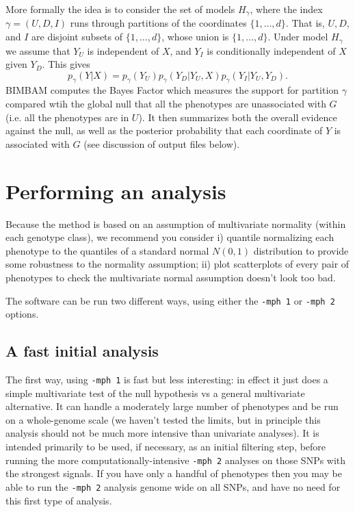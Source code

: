 \documentclass[11pt]{article}
\def\I{I}
\def\U{U}
\def\D{D}
\def\p{p}
\begin{document}
More formally the idea is to consider the set of models $H_\gamma$, where the index $\gamma=(\U,\D,\I)$ runs through 
partitions of the coordinates $\{1,\dots,d\}$.
That is, $\U, \D$, and $\I$ are disjoint subsets of $\{1,\dots,d\}$, whose union is $\{1,\dots,d\}$. 
Under model $H_\gamma$ we assume that $Y_\U$ is independent of $X$, and $Y_\I$ is conditionally independent of $X$ given $Y_\D$. This gives
\begin{equation}
{\p}_\gamma(Y | X) = {\p}_\gamma(Y_{\U}) {\p}_{\gamma}(Y_{\D} | Y_{\U}, X) {\p}_\gamma(Y_{\I} | Y_{\U},Y_{\D}).
\end{equation}
BIMBAM computes the Bayes Factor which measures the support for partition $\gamma$ compared wtih the global null that all the phenotypes are unassociated with $G$ (i.e. all the phenotypes are in $U$). It then summarizes both the overall evidence against the null, as well as the posterior probability that each coordinate of $Y$ is associated with $G$ (see discussion of output files below).

\section{Performing an analysis}

Because the method is based on an assumption of multivariate normality (within each genotype class),
we recommend you consider  i) quantile normalizing each phenotype to the quantiles of a standard normal $N(0,1)$ distribution to provide some robustness to the normality assumption; ii) plot scatterplots of every pair of phenotypes to check the multivariate normal assumption doesn't look too bad.

The software can be run two different ways, using either the {\tt -mph 1} or {\tt -mph 2} options.

\subsection{A fast initial analysis}

The first way, using {\tt -mph 1} is fast but less interesting: in effect it just does a simple multivariate test of the null hypothesis vs a general multivariate alternative. It can handle a moderately large
number of phenotypes and be run on a whole-genome scale (we haven't tested the limits, but in principle this analysis should not be much more intensive than univariate analyses). It is intended
primarily to be used, if necessary, as an initial filtering step, before running the more computationally-intensive {\tt -mph 2} analyses on those SNPs with the strongest signals. If you have only a handful of phenotypes then you may be able to run the {\tt -mph 2} analysis genome wide on all SNPs, and have no need for this first type of analysis.
\end{document}
